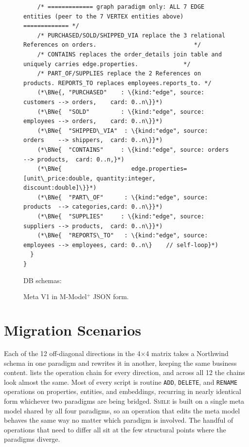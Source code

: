\begin{figure}[htbp]
\begin{lstlisting}
    /* ============= graph paradigm only: ALL 7 EDGE entities (peer to the 7 VERTEX entities above) ============= */
    /* PURCHASED/SOLD/SHIPPED_VIA replace the 3 relational References on orders.                            */
    /* CONTAINS replaces the order_details join table and uniquely carries edge.properties.             */
    /* PART_OF/SUPPLIES replace the 2 References on products. REPORTS_TO replaces employees.reports_to. */
    (*\BNe{, "PURCHASED"    : \{kind:"edge", source: customers --> orders,    card: 0..n\}}*)
    (*\BNe{  "SOLD"         : \{kind:"edge", source: employees --> orders,    card: 0..n\}}*)
    (*\BNe{  "SHIPPED\_VIA"  : \{kind:"edge", source: orders    --> shippers,  card: 0..n\}}*)
    (*\BNe{  "CONTAINS"     : \{kind:"edge", source: orders    --> products,  card: 0..n,}*)
    (*\BNe{                    edge.properties=[unit\_price:double, quantity:integer, discount:double]\}}*)
    (*\BNe{  "PART\_OF"      : \{kind:"edge", source: products  --> categories,card: 0..n\}}*)
    (*\BNe{  "SUPPLIES"     : \{kind:"edge", source: suppliers --> products,  card: 0..n\}}*)
    (*\BNe{  "REPORTS\_TO"   : \{kind:"edge", source: employees --> employees, card: 0..n\}    // self-loop}*)
  }
}
\end{lstlisting}

\smallskip
{\footnotesize DB schemas:\quad
{}\quad
{}\quad
{}\quad
{}}

\caption{Meta V1 in M-Model$^{+}$ JSON form.}
\label{fig:nw-meta-v1}
\end{figure}

\section{Migration Scenarios}\label{sec:eval-migration}

Each of the 12 off-diagonal directions in the 4$\times$4 matrix takes a Northwind schema in one paradigm and rewrites it in another, keeping the same business content.  lists the operation chain for every direction, and across all 12 the chains look almost the same. Most of every script is routine \texttt{ADD}, \texttt{DELETE}, and \texttt{RENAME} operations on properties, entities, and embeddings, recurring in nearly identical form whichever two paradigms are being bridged. \textsc{Smile} is built on a single meta model shared by all four paradigms, so an operation that edits the meta model behaves the same way no matter which paradigm is involved. The handful of operations that need to differ all sit at the few structural points where the paradigms diverge.

